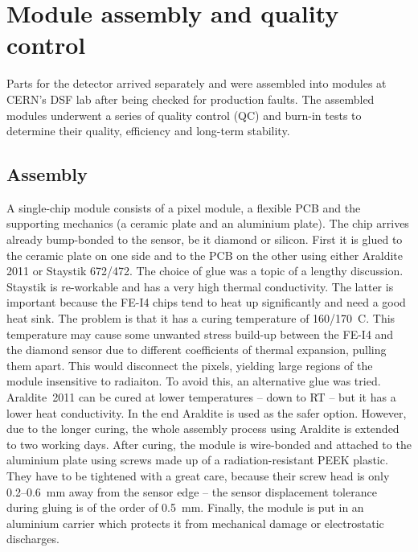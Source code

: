 \documentclass[twoside,12pt]{packages/mytustyle}  %
\begin{document}
\section{Module assembly and quality control}
Parts for the detector arrived separately and were assembled into modules at CERN's DSF lab after being checked for production faults. The assembled modules underwent a series of quality control (QC) and burn-in tests to determine their quality, efficiency and long-term stability.
\subsection{Assembly}
A single-chip module consists of a pixel module, a flexible PCB and the supporting mechanics (a ceramic plate and an aluminium plate). The chip arrives already bump-bonded to the sensor, be it diamond or silicon. First it is glued to the ceramic plate on one side and to the PCB on the other using either Araldite 2011 or Staystik 672/472. The choice of glue was a topic of a lengthy discussion. Staystik is re-workable and has a very high thermal conductivity. The latter is important because the FE-I4 chips tend to heat up significantly and need a good heat sink. The problem is that it has a curing temperature of 160/170~\textdegree C. This temperature may cause some unwanted stress build-up between the FE-I4 and the diamond sensor due to different coefficients of thermal expansion, pulling them apart. This would disconnect the pixels, yielding large regions of the module insensitive to radiaiton. To avoid this, an alternative glue was tried. Araldite~2011 can be cured at lower temperatures -- down to RT -- but it has a lower heat conductivity. In the end Araldite is used as the safer option. However, due to the longer curing, the whole assembly process using Araldite is extended to two working days. After curing, the module is wire-bonded and attached to the aluminium plate using screws made up of a radiation-resistant PEEK plastic. They have to be tightened with a great care, because their screw head is only 0.2--0.6~mm away from the sensor edge -- the sensor displacement tolerance during gluing is of the order of 0.5~mm. Finally, the module is put in an aluminium carrier which protects it from mechanical damage or electrostatic discharges.
\end{document}
